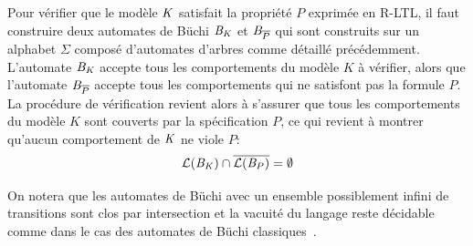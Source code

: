 


Pour vérifier que le modèle $\mathit K$ satisfait la propriété $P$ exprimée en R-LTL, 
il faut construire deux automates de Büchi $\mathit B_\mathit K$ et $\mathit B_{\overline{P}}$
qui sont construits sur un alphabet $\Sigma$ composé d'automates d'arbres comme 
détaillé précédemment. L'automate $\mathit B_\mathit K$ accepte tous les comportements
du modèle $K$ à vérifier, alors que l'automate $\mathit B_{\overline{P}}$ accepte
tous les comportements qui ne satisfont pas la formule $P$.
La procédure de vérification revient alors à s'assurer que tous les comportements du modèle
$K$ sont couverts par la spécification $P$, ce qui revient à montrer qu'aucun comportement
de $\mathit K$ ne viole $P$:
\[ \mathcal{L}(\mathit B_\mathit K) \cap \overline{\mathcal{L}(\mathit B_P)} = \emptyset \]

On notera que les automates de Büchi avec un ensemble possiblement infini de transitions
sont clos par intersection et la vacuité du langage reste décidable comme dans le cas des automates
de Büchi classiques~\cite{Buchi}.


